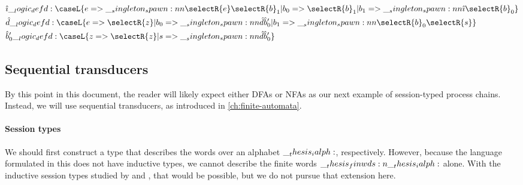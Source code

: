 \begin{equation*}
  \begin{lgathered}
    \defp{\imath} \defd \caseL{e => \spawn{\selectR{e}}{\selectR{b}_1}
                             | b_0 => \selectR{b}_1
                             | b_1 => \spawn{\defp{\imath}}{\selectR{b}_0}}
    \\
    \defp{d} \defd \caseL{e => \selectR{z}
                        | b_0 => \spawn{\defp{d}}{\defp{b}'_0}
                        | b_1 => \spawn{\selectR{b}_0}{\selectR{s}}}
    \\
    \defp{b}'_0 \defd \caseL{z => \selectR{z}
                           | s => \spawn{\defp{d}}{\defp{b}'_0}}
  \end{lgathered}
\end{equation*}



\subsection{Sequential transducers}\label{sec:process-chains:transducer}

By this point in this document, the reader will likely expect either \acp{DFA} or \acp{NFA} as our next example of session-typed process chains.
Instead, we will use sequential transducers, as introduced in \cref{ch:finite-automata}.

\paragraph*{Session types}

We should first construct a type that describes the words over an alphabet $\__thesis_ialph:$, respectively.
However, because the language formulated in this  does not have inductive types, we cannot describe the finite words $\__thesis_finwds:n {\__thesis_ialph:}$ alone.
With the inductive session types studied by \textcite{Derakhshan+Pfenning:LMCS20} and \textcite{Somayyajula+Pfenning:20}, that would be possible, but we do not pursue that extension here.

